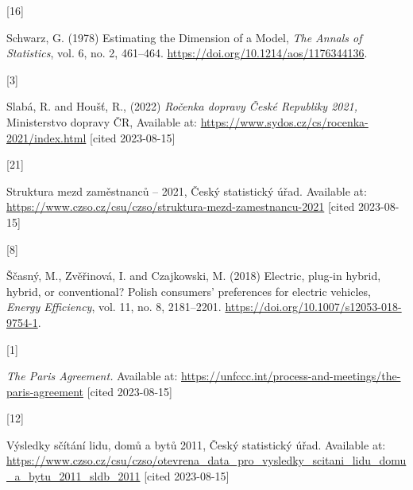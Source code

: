 \documentclass{mmeproc}
\newlength{\cslhangindent}
\newlength{\csllabelwidth}
\newenvironment{CSLReferences}[2] %
 {%
  \setlength{\parindent}{0pt}
  \ifodd #1
  \fi
  \setlength{\parskip}{-2pt}
 }%
 {}
\newcommand{\CSLLeftMargin}[1]{\parbox[t]{\csllabelwidth}{#1}}
\newcommand{\CSLRightInline}[1]{\parbox[t]{\linewidth - \csllabelwidth}{#1}\break}
\begin{document}
\begin{CSLReferences}{0}{0}
\leavevmode{}%
\CSLLeftMargin{{[}16{]} }%
\CSLRightInline{Schwarz, G. (1978) {Estimating the {Dimension} of a
{Model},} \emph{The Annals of Statistics}, vol. 6, no. 2, 461--464.
\url{https://doi.org/10.1214/aos/1176344136}.}

\leavevmode{}%
\CSLLeftMargin{{[}3{]} }%
\CSLRightInline{Slabá, R. and Houšť, R., (2022) \emph{Ročenka dopravy {České
Republiky} 2021,} {Ministerstvo dopravy ČR}, Available at:
\url{https://www.sydos.cz/cs/rocenka-2021/index.html} {{[}cited 2023-08-15{]}}}

\leavevmode{}%
\CSLLeftMargin{{[}21{]} }%
\CSLRightInline{{Struktura mezd zaměstnanců -- 2021,} Český
statistický úřad. Available at:
\url{https://www.czso.cz/csu/czso/struktura-mezd-zamestnancu-2021} {{[}cited 2023-08-15{]}}}

\leavevmode{}%
\CSLLeftMargin{{[}8{]} }%
\CSLRightInline{Ščasný, M., Zvěřinová, I. and Czajkowski, M. (2018) {Electric,
plug-in hybrid, hybrid, or conventional? {Polish} consumers' preferences
for electric vehicles,} \emph{Energy Efficiency}, vol. 11, no. 8, 2181--2201.
\url{https://doi.org/10.1007/s12053-018-9754-1}.}

\leavevmode{}%
\CSLLeftMargin{{[}1{]} }%
\CSLRightInline{\emph{The {Paris} {Agreement}.} Available at:
\url{https://unfccc.int/process-and-meetings/the-paris-agreement} {{[}cited 2023-08-15{]}}}

\leavevmode{}%
\CSLLeftMargin{{[}12{]} }%
\CSLRightInline{{Výsledky sčítání lidu, domů a bytů 2011}, Český statistický úřad. Available at:
\url{https://www.czso.cz/csu/czso/otevrena_data_pro_vysledky_scitani_lidu_domu_a_bytu_2011_sldb_2011} {{[}cited 2023-08-15{]}}}

\end{CSLReferences}
\end{document}

